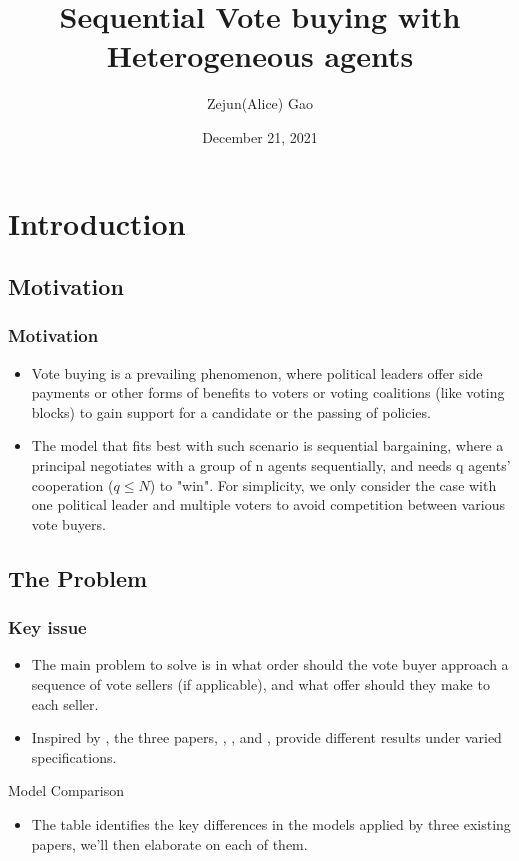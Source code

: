 \documentclass[pdflatex]{beamer}
\title[Sequential Bargaining]{Sequential Vote buying with Heterogeneous agents}
\author[Gao]{Zejun(Alice) Gao}
\institute[JHU]{Johns Hopkins University}
\date[\today]{December 21, 2021}
\providecommand{\TableDir}{\econtexRoot/Tables}
\begin{document}


\begin{frame}[plain]
  \titlepage
\end{frame}


\section{Introduction}
\subsection{Motivation}

\begin{frame}
\frametitle{Motivation}
	\begin{itemize}
		\item Vote buying is a prevailing phenomenon, where political leaders offer side payments or other forms of benefits to voters or voting coalitions (like voting blocks) to gain support for a candidate or the passing of policies.
		\item The model that fits best with such scenario is sequential bargaining, where a principal negotiates with a group of n agents sequentially, and needs q agents' cooperation ($q \leq N$) to "win". For simplicity, we only consider the case with one political leader and multiple voters to avoid competition between various vote buyers.
	\end{itemize}
\end{frame}

\subsection{The Problem}
\begin{frame}
\frametitle{Key issue}
	\begin{itemize}
		\item The main problem to solve is in what order should the vote buyer approach a sequence of vote sellers (if applicable), and what offer should they make to each seller.
		\item Inspired by \cite{Cai03}, the three papers, \cite{Xiao}, \cite{InOCoHoldUP}, and \cite{CnZSeqVB}, provide different results under varied specifications.
	\end{itemize}	
\end{frame}

\begin{frame}[shrink = 25]{Model Comparison}
	\bigskip
	\bigskip
	
	\bigskip
	\begin{itemize}
		\item The table identifies the key differences in the models applied by three existing papers, we'll then elaborate on each of them.
	\end{itemize}
	
\end{frame}
\end{document}

